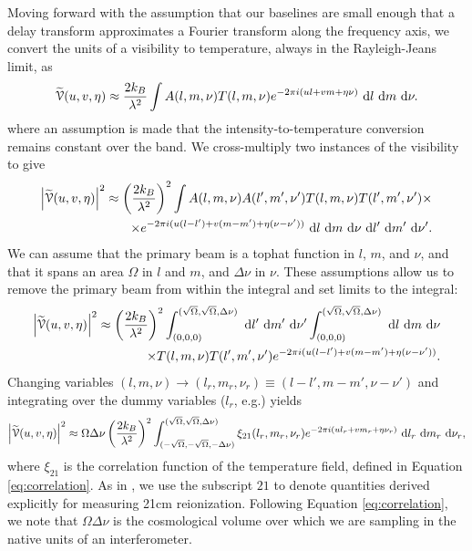 Moving forward with the assumption that our baselines are small enough that a delay transform
approximates a Fourier transform along the frequency axis, we convert the units of a visibility to
temperature, always in the Rayleigh-Jeans limit, as
\begin{equation}
  \widetilde{\mathcal{V}}(u,v,\eta) \approx 
  \frac{2k_B}{\lambda^2}
  \int A(l,m,\nu)T(l,m,\nu)
    e^{-2\pi i(ul+vm+\eta\nu)}\ \mathrm{d}l\ \mathrm{d}m\ \mathrm{d}\nu.
  \label{eq:def_visT}
\end{equation}
where an assumption is made that the intensity-to-temperature conversion remains constant over the
band. We cross-multiply two instances of the visibility to give
\begin{align}
  \left|\widetilde{\mathcal{V}}(u,v,\eta)\right|^2 
  \approx 
  \left(\frac{2k_B}{\lambda^2}\right)^2
  \int 
  A(l,m,\nu)A(l',m',\nu')
  T(l,m,\nu)T(l',m',\nu')
  \times
  \nonumber \\ \times
  e^{-2\pi i(u(l-l')+v(m-m')+\eta(\nu-\nu'))}
    \ \mathrm{d}l\ \mathrm{d}m\ \mathrm{d}\nu
    \ \mathrm{d}l'\ \mathrm{d}m'\ \mathrm{d}\nu'.
\end{align}
We can assume that the primary beam is a tophat function in $l$, $m$, and $\nu$, and that it spans an area
$\Omega$ in $l$ and $m$, and
$\Delta\nu$ in $\nu$. These assumptions allow us to remove
the primary beam from within the integral and set limits to the integral:
\begin{align}
  \left|\widetilde{\mathcal{V}}(u,v,\eta)\right|^2 
  \approx 
  \left(\frac{2k_B}{\lambda^2}\right)^2
  \int^{(\sqrt{\Omega},\sqrt{\Omega},\Delta\nu)}_{(0,0,0)}
    \ \mathrm{d}l'\ \mathrm{d}m'\ \mathrm{d}\nu'
  \int^{(\sqrt{\Omega},\sqrt{\Omega},\Delta\nu)}_{(0,0,0)} 
    \ \mathrm{d}l\ \mathrm{d}m\ \mathrm{d}\nu
  \nonumber \\ \times
  T(l,m,\nu)T(l',m',\nu')
  e^{-2\pi i(u(l-l')+v(m-m')+\eta(\nu-\nu'))}.
\end{align}
Changing variables $(l,m,\nu)\to(l_r,m_r,\nu_r)\equiv(l-l',m-m',\nu-\nu')$ and integrating over the
dummy variables ($l_r$, e.g.) yields
\begin{align}
  \left|\widetilde{\mathcal{V}}(u,v,\eta)\right|^2 
  \approx 
  \Omega\Delta\nu
  \left(\frac{2k_B}{\lambda^2}\right)^2
  \int^{(\sqrt{\Omega},\sqrt{\Omega},\Delta\nu)}_{(-\sqrt{\Omega},-\sqrt{\Omega},-\Delta\nu)}
  \xi_{21}(l_r,m_r,\nu_r)
  e^{-2\pi i(ul_r+vm_r+\eta\nu_r)}
  \ \mathrm{d}l_r\ \mathrm{d}m_r\ \mathrm{d}\nu_r,
  \label{eq:Vsquared-nosinc,uvnu}
\end{align}
where $\xi_{21}$ is the correlation function of the temperature field, defined in Equation
\ref{eq:correlation}. As in \citet{PAPERSensitivity}, we use the subscript $21$ to denote quantities
derived explicitly for measuring 21cm reionization. Following Equation \ref{eq:correlation}, we
note that $\Omega\Delta\nu$ is the cosmological volume over which we are sampling in the native
units of an interferometer.

